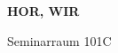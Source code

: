 \documentclass[a4paper]{article}
\begin{document}
\printGenericVSLHeader
\begin{center}
\begin{vsltext}{3cm}{4cm}

   \vspace{0.5cm} 

    \textbf{HOR, WIR} 

    \vspace{1.5cm}

    Seminarraum 101C

\end{vsltext}

\end{center}
\end{document}
